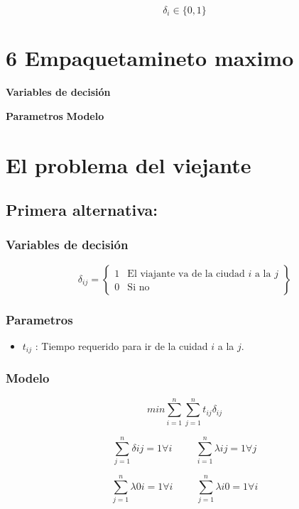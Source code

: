 \documentclass[]{article}
\begin{document}
{$$\delta_i \in \{0,1\}$$
\section{6 Empaquetamineto maximo }
\textbf{Variables de decisi\'on}



\textbf{Parametros}
\textbf{Modelo}


\section{El problema del viejante}

\subsection{Primera alternativa:}

\subsubsection{Variables de decisi\'on}

\begin{equation*}
\delta_{ij} = 
\left\{ \begin{array}{cl}
1 & \mbox{El viajante va de la ciudad $i$ a la $j$}\\
0 & \mbox{Si no}
\end{array} \right\}
\end{equation*}



\subsubsection{Parametros}

\begin{itemize}
	\item $t_{ij}$ : Tiempo requerido para ir de la cuidad $i$ a la $j$. 
\end{itemize}

\subsubsection{Modelo}

$$min \sum_{i=1}^{n} \sum_{j=1}^{n} t_{ij} \delta_{ij}$$

$$\sum_{j=1}^{n} \delta{ij} =  1 \forall i  \hspace{1cm}  \sum_{i=1}^{n} \lambda{ij} =  1 \forall j$$


$$\sum_{j=1}^{n} \lambda{0i} =  1 \forall i   \hspace{1cm}  \sum_{j=1}^{n} \lambda{i0} =  1 \forall i$$

}
\end{document}
